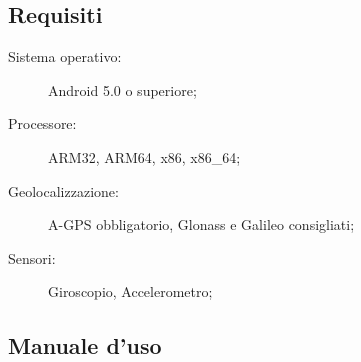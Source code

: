 \documentclass[../manuale-utente.tex]{subfiles}
\begin{document}
\subsection{Requisiti}%
\label{sub:requisiti}


\begin{description}
    \item[Sistema operativo:] Android 5.0 o superiore;
    \item[Processore:] ARM32, ARM64, x86, x86\_64;
    \item[Geolocalizzazione:] A-GPS obbligatorio, Glonass e Galileo consigliati;
    \item[Sensori:] Giroscopio, Accelerometro;
\end{description}

\subsection{Manuale d'uso}%
\label{sub:manuale-duso-mobile}
\end{document}
